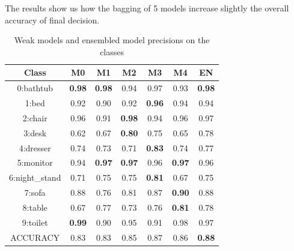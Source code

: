 The results show us how the bagging of 5 models increase slightly the overall accuracy of final decision. 

\begin{table}[h]
	\centering
	\caption{Weak models and ensembled model precisions on the classes}
	\label{tab:precisions}
	\begin{tabular}{|c||c|c|c|c|c||c|}
		\hline
		Class & M0 & M1 & M2 & M3 & M4 & EN\\
		\hline
		\hline
  
            0:bathtub      & \textbf{0.98} & \textbf{0.98} & 0.94 & 0.97 & 0.93 & \textbf{0.98}\\\hline
            1:bed          & 0.92 & 0.90 & 0.92 & \textbf{0.96} & 0.94 & 0.94\\\hline
            2:chair        & 0.96 & 0.91 & \textbf{0.98} & 0.94 & 0.96 & 0.97\\\hline
            3:desk         & 0.62 & 0.67 & \textbf{0.80} & 0.75 & 0.65 & 0.78\\\hline
            4:dresser      & 0.74 & 0.73 & 0.71 & \textbf{0.83} & 0.74 & 0.77\\\hline
            5:monitor      & 0.94 & \textbf{0.97} & \textbf{0.97} & 0.96 & \textbf{0.97} & 0.96\\\hline
            6:night\_stand & 0.71 & 0.75 & 0.75 & \textbf{0.81} & 0.67 & 0.75\\\hline
            7:sofa         & 0.88 & 0.76 & 0.81 & 0.87 & \textbf{0.90} & 0.88\\\hline
            8:table        & 0.67 & 0.77 & 0.73 & 0.76 & \textbf{0.81} & 0.78\\\hline
            9:toilet       & \textbf{0.99} & 0.90 & 0.95 & 0.91 & 0.98 & 0.97\\\hline
		\hline
            ACCURACY       & 0.83 & 0.83 & 0.85 & 0.87 & 0.86 & \textbf{0.88}\\\hline


\end{tabular}
\end{table}
